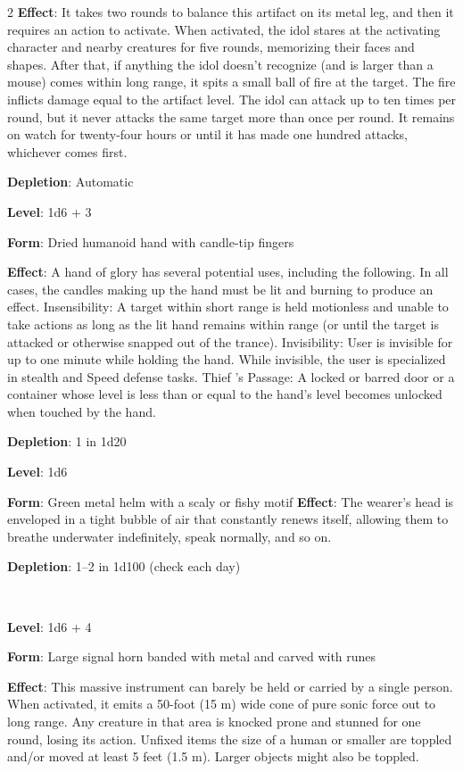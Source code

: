 \begin{multicols}{2}
\textbf{Effect}: It takes two rounds to balance this artifact on its metal leg, and then it requires an action to activate. When activated, the idol stares at the activating character and nearby creatures for five rounds, memorizing their faces and shapes. After that, if anything the idol doesn’t recognize (and is larger than a mouse) comes within long range, it spits a small ball of fire at the target. The fire inflicts damage equal to the artifact level. The idol can attack up to ten times per round, but it never attacks the same target more than once per round. It remains on watch for twenty-four hours or until it has made one hundred attacks, whichever comes first. 

\textbf{Depletion}: Automatic


\textbf{Level}: 1d6 + 3 

\textbf{Form}: Dried humanoid hand with candle-tip fingers 

\textbf{Effect}: A hand of glory has several potential uses, including the following. In all cases, the candles making up the hand must be lit and burning to produce an effect. Insensibility: A target within short range is held motionless and unable to take actions as long as the lit hand remains within range (or until the target is attacked or otherwise snapped out of the trance). Invisibility: User is invisible for up to one minute while holding the hand. While invisible, the user is specialized in stealth and Speed defense tasks. Thief ’s Passage: A locked or barred door or a container whose level is less than or equal to the hand’s level becomes unlocked when touched by the hand. 

\textbf{Depletion}: 1 in 1d20 


\textbf{Level}: 1d6 

\textbf{Form}: Green metal helm with a scaly or fishy motif \textbf{Effect}: The wearer’s head is enveloped in a tight bubble of air that constantly renews itself, allowing them to breathe underwater indefinitely, speak normally, and so on. 

\textbf{Depletion}: 1–2 in 1d100 (check each day) 


\textbf{Level}: 1d6 + 4 

\textbf{Form}: Large signal horn banded with metal and carved with runes 

\textbf{Effect}: This massive instrument can barely be held or carried by a single person. When activated, it emits a 50-foot (15 m) wide cone of pure sonic force out to long range. Any creature in that area is knocked prone and stunned for one round, losing its action. Unfixed items the size of a human or smaller are toppled and/or moved at least 5 feet (1.5 m). Larger objects might also be toppled. 


\end{multicols}

